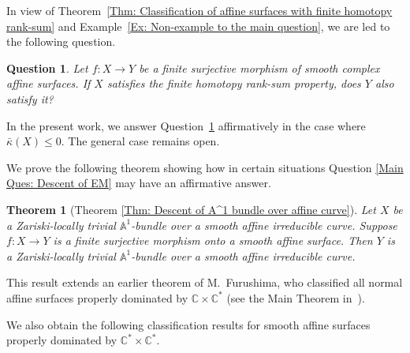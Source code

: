 \documentclass[12pt,reqno,twoside]{amsart}
\newtheorem{question}[theorem]{Question}
\newtheorem{mainthm}{Theorem}
\theoremstyle{definition}
\numberwithin{equation}{section}
\newcommand{\A}{\mathbb{A}}
\newcommand{\C}{\mathbb{C}}
\newcommand{\Kbar}{\bar{\kappa}}
\begin{document}
In view of Theorem~\ref{Thm: Classification of affine surfaces with finite homotopy rank-sum} and Example~\ref{Ex: Non-example to the main question}, we are led to the following question.

\begin{question}\label{Main Ques: Descent of finite homotopy rank-sum}
Let $f \colon X \to Y$ be a finite surjective morphism of smooth complex affine surfaces. If $X$ satisfies the finite homotopy rank-sum property, does $Y$ also satisfy it?
\end{question}

In the present work, we answer Question~\ref{Main Ques: Descent of finite homotopy rank-sum} affirmatively in the case where $\Kbar(X)\le 0$. The general case remains open.

\medskip

We prove the following theorem showing how in certain situations Question \ref{Main Ques: Descent of EM} may have an affirmative answer.

\begin{mainthm}[{Theorem \ref{Thm: Descent of A^1 bundle over affine curve}}]\label{thm:mainA}
Let $X$ be a Zariski-locally trivial $\A^1$-bundle over a smooth affine irreducible curve. Suppose $f \colon X \to Y$ is a finite surjective morphism onto a smooth affine surface. Then $Y$ is a Zariski-locally trivial $\A^1$-bundle over a smooth affine irreducible curve.
\end{mainthm}

This result extends an earlier theorem of M.~Furushima, who classified all normal affine surfaces properly dominated by $\C\times \C^*$ (see the Main Theorem in~\cite{Fur1989}).

\medskip

We also obtain the following classification results for smooth affine surfaces properly dominated by $\C^*\times \C^*$.
\end{document}

